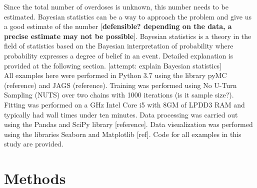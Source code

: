 \documentclass[]{article}
\begin{document}
Since the total number of overdoses is unknown, this number needs to be estimated. Bayesian statistics can be a way to approach the problem and give us a good estimate of the number [\textbf{defensible? depending on the data, a precise estimate may not be possible}]. Bayesian statistics is a theory in the field of statistics based on the Bayesian interpretation of probability where probability expresses a degree of belief in an event. \cite{wiki_bayes} Detailed explanation is provided at the following section. [attempt: explain Bayesian statistics]\\

All examples here were performed in Python 3.7 using the library pyMC (reference) and JAGS (reference). Training was performed using No U-Turn Sampling (NUTS) over two chains with 1000 iterations (is it sample size?). Fitting was performed on a GHz Intel Core i5 with 8GM of LPDD3 RAM and typically had wall times under ten minutes. Data processing was carried out using the Pandas and SciPy library [reference]. Data visualization was performed using the libraries Seaborn and Matplotlib [ref]. Code for all examples in this study are provided. \\

\section{Methods}

\normalsize
\end{document}
